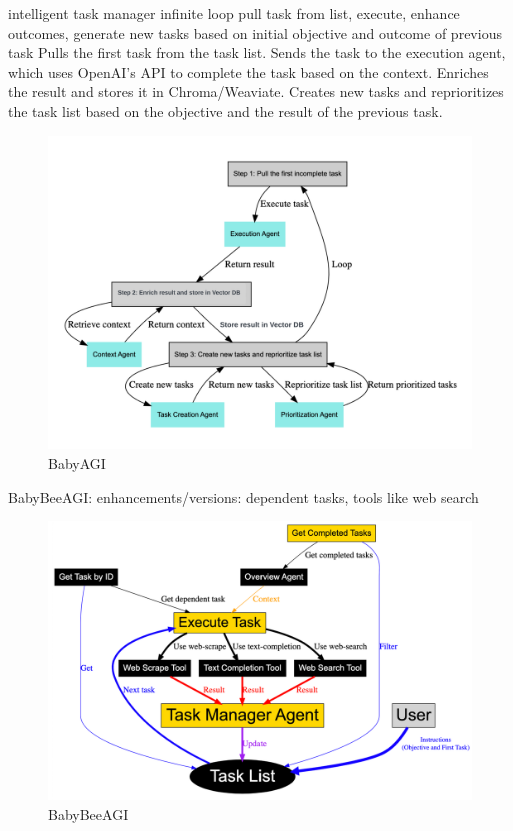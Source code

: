 \documentclass{article}
\begin{document}
\cite{noauthor_babyagi_nodate} \cite{nakajima_babybeeagi_2023}
intelligent task manager
infinite loop
pull task from list, execute, enhance outcomes, generate new tasks based on initial objective and outcome of previous task
Pulls the first task from the task list.
Sends the task to the execution agent, which uses OpenAI's API to complete the task based on the context.
Enriches the result and stores it in Chroma/Weaviate.
Creates new tasks and reprioritizes the task list based on the objective and the result of the previous task.
\begin{figure}[h]
	\centering
	\includegraphics[width=0.75\linewidth]{BabyAGIFlow}
	\caption{BabyAGI \cite{noauthor_babyagi_nodate}}
	\label{fig:babyagiflow}
\end{figure}
BabyBeeAGI: enhancements/versions: dependent tasks, tools like web search
\begin{figure}[h]
	\centering
	\includegraphics[width=0.75\linewidth]{BabyBeeAGIFlow}
	\caption{BabyBeeAGI \cite{nakajima_babybeeagi_2023}}
	\label{fig:babyagiflow}
\end{figure}
\end{document}
